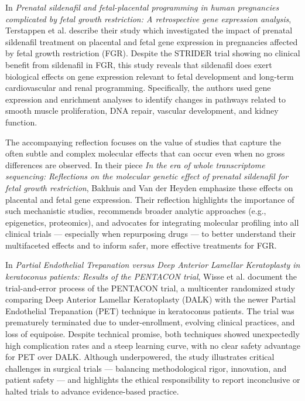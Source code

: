 \documentclass[authordate, empirical, issue]{jote-new-article}
\begin{document}
	In \emph{Prenatal sildenafil and fetal-placental programming in human pregnancies complicated by fetal growth restriction: A retrospective gene expression analysis}, Terstappen et al. describe their study which investigated the impact of prenatal sildenafil treatment on placental and fetal gene expression in pregnancies affected by fetal growth restriction (FGR). Despite the STRIDER trial showing no clinical benefit from sildenafil in FGR, this study reveals that sildenafil does exert biological effects on gene expression relevant to fetal development and long-term cardiovascular and renal programming. Specifically, the authors used gene expression and enrichment analyses to identify changes in pathways related to smooth muscle proliferation, DNA repair, vascular development, and kidney function.



	The accompanying reflection focuses on the value of studies that capture the often subtle and complex molecular effects that can occur even when no gross differences are observed. In their piece \emph{In the era of whole transcriptome sequencing: Reflections on the molecular genetic effect of prenatal sildenafil for fetal growth restriction}, Bakhuis and Van der Heyden emphasize these effects on placental and fetal gene expression. Their reflection highlights the importance of such mechanistic studies, recommends broader analytic approaches (e.g., epigenetics, proteomics), and advocates for integrating molecular profiling into all clinical trials — especially when repurposing drugs — to better understand their multifaceted effects and to inform safer, more effective treatments for FGR.



	In \emph{Partial Endothelial Trepanation versus Deep Anterior Lamellar Keratoplasty in keratoconus patients: Results of the PENTACON trial}, Wisse et al. document the trial-and-error process of the PENTACON trial, a multicenter randomized study comparing Deep Anterior Lamellar Keratoplasty (DALK) with the newer Partial Endothelial Trepanation (PET) technique in keratoconus patients. The trial was prematurely terminated due to under-enrollment, evolving clinical practices, and loss of equipoise. Despite technical promise, both techniques showed unexpectedly high complication rates and a steep learning curve, with no clear safety advantage for PET over DALK. Although underpowered, the study illustrates critical challenges in surgical trials — balancing methodological rigor, innovation, and patient safety — and highlights the ethical responsibility to report inconclusive or halted trials to advance evidence-based practice.
\end{document}
